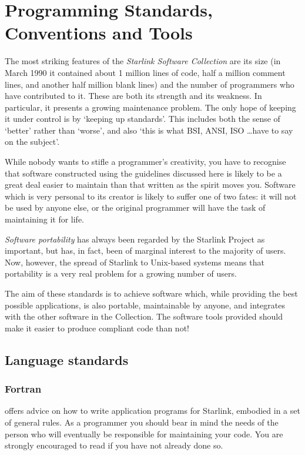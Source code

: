 \chapter{Programming Standards, Conventions and Tools}
\label{C_standards}

The most striking features of the {\em Starlink Software Collection} are
its size (in March 1990 it contained about 1 million lines of code, half a
million comment lines, and another half million blank lines) and the number of
programmers who have contributed to it.
These are both its strength and its weakness.
In particular, it presents a growing maintenance problem.
The only hope of keeping it under control is by `keeping up standards'.
This includes both the sense of `better' rather than `worse', and also `this
is what BSI, ANSI, ISO \ldots have to say on the subject'.

While nobody wants to stifle a programmer's creativity, you have to recognise
that software constructed using the guidelines discussed here is likely to be
a great deal easier to maintain than that written as the spirit moves you.
Software which is very personal to its creator is likely to suffer one of
two fates: it will not be used by anyone else, or the original programmer
will have the task of maintaining it for life.

{\em Software portability} has always been regarded by the Starlink Project as
important, but has, in fact, been of marginal interest to the majority of
users.
Now, however, the spread of Starlink to Unix-based systems means that
portability is a very real problem for a growing number of users.

The aim of these standards is to achieve software which, while providing the
best possible applications, is also portable, maintainable by anyone, and
integrates with the other software in the Collection.
The software tools provided should make it easier to produce compliant
code than not!

\section{Language standards}
\label{S_langstand}

\subsection{Fortran}

 offers advice on how to write application programs for
Starlink, embodied in a set of general rules.
As a programmer you should bear in mind the needs of the person who will
eventually be responsible for maintaining your code.
You are strongly encouraged to read
 if you have not already done so.

